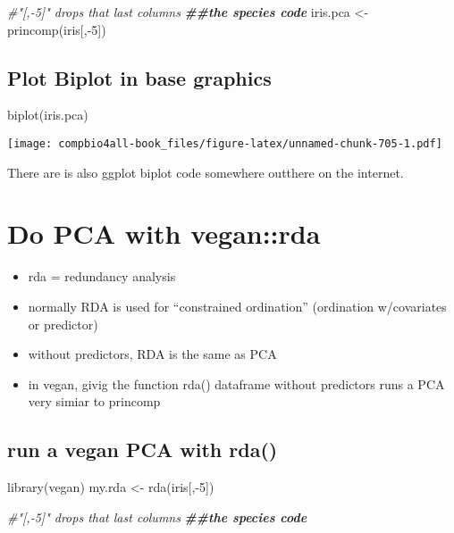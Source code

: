 \documentclass[
]{book}
\newenvironment{Shaded}{\begin{snugshade}}{\end{snugshade}}
\newcommand{\CommentTok}[1]{\textcolor[rgb]{0.56,0.35,0.01}{\textit{#1}}}
\newcommand{\DecValTok}[1]{\textcolor[rgb]{0.00,0.00,0.81}{#1}}
\newcommand{\DocumentationTok}[1]{\textcolor[rgb]{0.56,0.35,0.01}{\textbf{\textit{#1}}}}
\newcommand{\FunctionTok}[1]{\textcolor[rgb]{0.00,0.00,0.00}{#1}}
\newcommand{\NormalTok}[1]{#1}
\newcommand{\OtherTok}[1]{\textcolor[rgb]{0.56,0.35,0.01}{#1}}
\newcommand{\SpecialCharTok}[1]{\textcolor[rgb]{0.00,0.00,0.00}{#1}}
\providecommand{\tightlist}{%
  \setlength{\itemsep}{0pt}\setlength{\parskip}{0pt}}
\begin{document}
\begin{Shaded}
\begin{Highlighting}[]
\CommentTok{\#"[,{-}5]" drops that last columns}
\DocumentationTok{\#\#the species code}
\NormalTok{iris.pca }\OtherTok{\textless{}{-}} \FunctionTok{princomp}\NormalTok{(iris[,}\SpecialCharTok{{-}}\DecValTok{5}\NormalTok{])}
\end{Highlighting}
\end{Shaded}

\hypertarget{plot-biplot-in-base-graphics}{%
\section{Plot Biplot in base graphics}\label{plot-biplot-in-base-graphics}}

\begin{Shaded}
\begin{Highlighting}[]
\FunctionTok{biplot}\NormalTok{(iris.pca)}
\end{Highlighting}
\end{Shaded}

\texttt{[image: compbio4all-book\_files/figure-latex/unnamed-chunk-705-1.pdf]}

There are is also ggplot biplot code somewhere outthere on the internet.

\hypertarget{do-pca-with-veganrda}{%
\chapter{Do PCA with vegan::rda}\label{do-pca-with-veganrda}}

\begin{itemize}
\tightlist
\item
  rda = redundancy analysis
\item
  normally RDA is used for ``constrained ordination'' (ordination w/covariates or predictor)
\item
  without predictors, RDA is the same as PCA
\item
  in vegan, givig the function rda() dataframe without predictors runs a PCA very simiar to princomp
\end{itemize}

\hypertarget{run-a-vegan-pca-with-rda}{%
\section{run a vegan PCA with rda()}\label{run-a-vegan-pca-with-rda}}

\begin{Shaded}
\begin{Highlighting}[]
\FunctionTok{library}\NormalTok{(vegan)}
\NormalTok{my.rda }\OtherTok{\textless{}{-}} \FunctionTok{rda}\NormalTok{(iris[,}\SpecialCharTok{{-}}\DecValTok{5}\NormalTok{])}


\CommentTok{\#"[,{-}5]" drops that last columns}
\DocumentationTok{\#\#the species code}
\end{Highlighting}
\end{Shaded}
\end{document}

